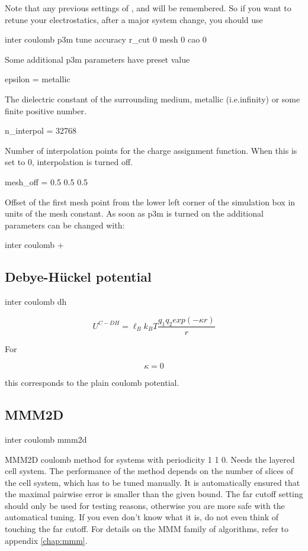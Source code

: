 Note that any previous settings of ,  and
 will be remembered. So if you want to retune your
electrostatics, \eg after a major system change, you should use
\begin{code}
inter coulomb  p3m tune accuracy  r_cut 0 mesh 0 cao 0
\end{code}

Some additional p3m parameters have preset value
\begin{tclcode}
 epsilon = metallic
\end{tclcode}
The dielectric constant of the surrounding medium, metallic
(i.e.infinity) or some finite positive number.
\begin{tclcode}
 n_interpol = 32768
\end{tclcode}
Number of interpolation points for the charge assignment function.
When this is set to 0, interpolation is turned off.
\begin{tclcode}
 mesh_off = 0.5 0.5 0.5
\end{tclcode}
Offset of the first mesh point from the lower left corner of the
simulation box in units of the mesh constant. As soon as p3m is turned
on the additional parameters can be changed with:
\begin{code}
inter coulomb  +
\end{code}


\subsection{Debye-H\"uckel potential}

\begin{essyntax}
  inter coulomb dh  
\end{essyntax}
\[ U^{C-DH} = \ell_B k_B T \frac{q_1 q_2 exp(-\kappa r)}{r} \]

For

\[ \kappa = 0 \]

this corresponds to the plain coulomb potential.

\subsection{MMM2D}

\begin{essyntax}
 inter coulomb mmm2d  
\end{essyntax}
MMM2D coulomb method for systems with periodicity 1 1 0. Needs the
layered cell system. The performance of the method depends on the
number of slices of the cell system, which has to be tuned manually.
It is automatically ensured that the maximal pairwise error is smaller
than the given bound. The far cutoff setting should only be used for
testing reasons, otherwise you are more safe with the automatical
tuning. If you even don't know what it is, do not even think of
touching the far cutoff. For details on the MMM family of algorithms,
refer to appendix \vref{chap:mmm}.

